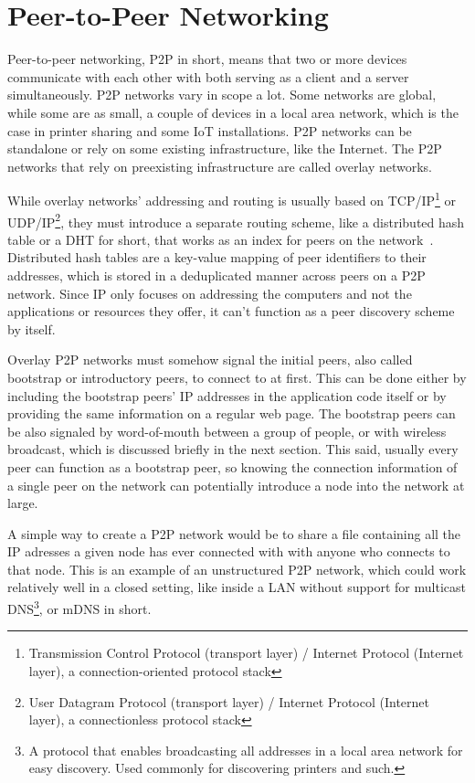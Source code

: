 \section{Peer-to-Peer Networking}
Peer-to-peer networking, P2P in short, means that two or more devices communicate with each other with both serving as a client and a server simultaneously. P2P networks vary in scope a lot. Some networks are global, while some are as small, a couple of devices in a local area network, which is the case in printer sharing and some IoT installations. P2P networks can be standalone or rely on some existing infrastructure, like the Internet. The P2P networks that rely on preexisting infrastructure are called overlay networks.

While overlay networks' addressing and routing is usually based on TCP/IP\footnote{Transmission Control Protocol (transport layer) / Internet Protocol (Internet layer), a connection-oriented protocol stack} or UDP/IP\footnote{User Datagram Protocol (transport layer) / Internet Protocol (Internet layer), a connectionless protocol stack}, they must introduce a separate routing scheme, like a distributed hash table or a DHT for short, that works as an index for peers on the network~\cite{Binzenhofer2007-dv}. Distributed hash tables are a key-value mapping of peer identifiers to their addresses, which is stored in a deduplicated manner across peers on a P2P network. Since IP only focuses on addressing the computers and not the applications or resources they offer, it can't function as a peer discovery scheme by itself.

Overlay P2P networks must somehow signal the initial peers, also called bootstrap or introductory peers, to connect to at first. This can be done either by including the bootstrap peers' IP addresses in the application code itself or by providing the same information on a regular web page. The bootstrap peers can be also signaled by word-of-mouth between a group of people, or with wireless broadcast, which is discussed briefly in the next section. This said, usually every peer can function as a bootstrap peer, so knowing the connection information of a single peer on the network can potentially introduce a node into the network at large.

A simple way to create a P2P network would be to share a file containing all the IP adresses a given node has ever connected with with anyone who connects to that node. This is an example of an unstructured P2P network, which could work relatively well in a closed setting, like inside a LAN without support for multicast DNS\footnote{A protocol that enables broadcasting all addresses in a local area network for easy discovery. Used commonly for discovering printers and such.}, or mDNS in short.


